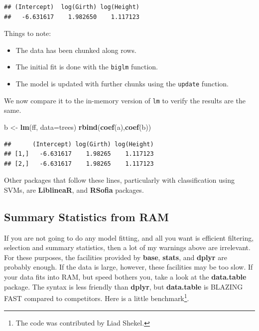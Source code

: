 \documentclass[]{book}
\newenvironment{Shaded}{\begin{snugshade}}{\end{snugshade}}
\newcommand{\KeywordTok}[1]{\textcolor[rgb]{0.13,0.29,0.53}{\textbf{{#1}}}}
\newcommand{\DataTypeTok}[1]{\textcolor[rgb]{0.13,0.29,0.53}{{#1}}}
\newcommand{\StringTok}[1]{\textcolor[rgb]{0.31,0.60,0.02}{{#1}}}
\newcommand{\NormalTok}[1]{{#1}}
\providecommand{\tightlist}{%
  \setlength{\itemsep}{0pt}\setlength{\parskip}{0pt}}
\theoremstyle{definition}
\theoremstyle{definition}
\theoremstyle{remark}
\begin{document}
\begin{verbatim}
## (Intercept)  log(Girth) log(Height) 
##   -6.631617    1.982650    1.117123
\end{verbatim}

Things to note:

\begin{itemize}
\tightlist
\item
  The data has been chunked along rows.
\item
  The initial fit is done with the \texttt{biglm} function.
\item
  The model is updated with further chunks using the \texttt{update}
  function.
\end{itemize}

We now compare it to the in-memory version of \texttt{lm} to verify the
results are the same.

\begin{Shaded}
\begin{Highlighting}[]
\NormalTok{b <-}\StringTok{ }\KeywordTok{lm}\NormalTok{(ff, }\DataTypeTok{data=}\NormalTok{trees)}
\KeywordTok{rbind}\NormalTok{(}\KeywordTok{coef}\NormalTok{(a),}\KeywordTok{coef}\NormalTok{(b))}
\end{Highlighting}
\end{Shaded}

\begin{verbatim}
##      (Intercept) log(Girth) log(Height)
## [1,]   -6.631617    1.98265    1.117123
## [2,]   -6.631617    1.98265    1.117123
\end{verbatim}

Other packages that follow these lines, particularly with classification
using SVMs, are \textbf{LiblineaR}, and \textbf{RSofia} packages.

\subsection{Summary Statistics from
RAM}\label{summary-statistics-from-ram}

If you are not going to do any model fitting, and all you want is
efficient filtering, selection and summary statistics, then a lot of my
warnings above are irrelevant. For these purposes, the facilities
provided by \textbf{base}, \textbf{stats}, and \textbf{dplyr} are
probably enough. If the data is large, however, these facilities may be
too slow. If your data fits into RAM, but speed bothers you, take a look
at the \textbf{data.table} package. The syntax is less friendly than
\textbf{dplyr}, but \textbf{data.table} is BLAZING FAST compared to
competitors. Here is a little benchmark\footnote{The code was
  contributed by Liad Shekel.}.
\end{document}
